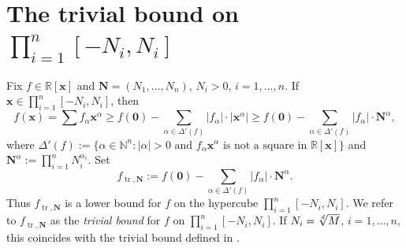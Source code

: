 \documentclass{amsart}
\theoremstyle{definition}
\begin{document}
\section{The trivial bound on $\prod_{i=1}^n[-N_i,N_i]$}
%
Fix $f\in \mathbb{R}[\mathbf{x}]$ and $\mathbf{N} = (N_1,\dots,N_n)$, $N_i>0$, $i=1,\dots,n$. If $\mathbf{x} \in \prod_{i=1}^n [-N_i,N_i]$, then
\[
	f(\mathbf{x}) = \sum f_{\alpha}\mathbf{x}^{\alpha} \ge f(\mathbf{0})-\sum_{\alpha \in \Delta'(f)} |f_{\alpha}|\cdot |\mathbf{x}^{\alpha}| \ge f(\mathbf{0})-\sum_{\alpha\in \Delta'(f)} |f_{\alpha}|\cdot\mathbf{N}^{\alpha},
\]
where $\Delta'(f):= \{ \alpha \in \mathbb{N}^n : |\alpha|>0 \text{ and } f_{\alpha}\mathbf{x}^{\alpha} \text{ is not a square in } \mathbb{R}[\mathbf{x}]\}$
and $\mathbf{N}^{\alpha} := \prod_{i=1}^n N_i^{\alpha_i}$. Set
%
\begin{equation}
f_{\operatorname{tr},\mathbf{N}} := f(\mathbf{0}) - \sum_{\alpha\in \Delta'(f)} |f_{\alpha}|\cdot \mathbf{N}^{\alpha}.
\end{equation}
%
Thus $f_{\operatorname{tr},\mathbf{N}}$ is a lower bound for $f$ on the hypercube $\prod_{i=1}^n [-N_i,N_i]$.
We refer to $f_{\operatorname{tr},\mathbf{N}}$ as the \textit{trivial bound} for $f$ on $\prod_{i=1}^n [-N_i,N_i]$.
If $N_i = \root d \of{M}$, $i=1,\dots,n$, this coincides with the trivial bound defined in \cite[Section 3]{gha-lass-mar}.
\end{document}

